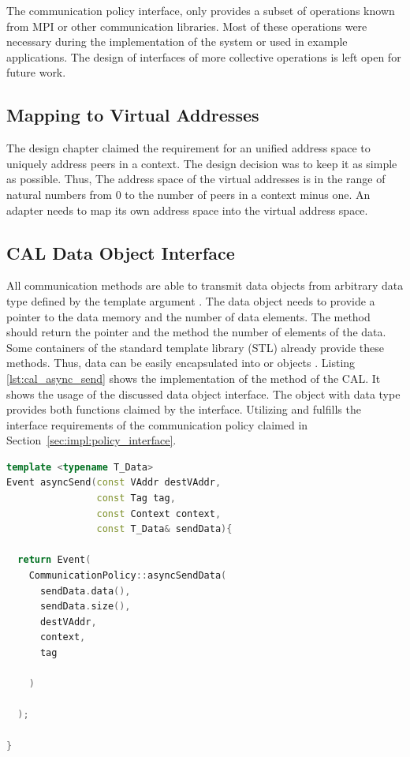 \noindent The communication policy interface, only provides a subset
of operations known from MPI or other communication libraries.  Most
of these operations were necessary during the implementation of the
system or used in example applications. The design of interfaces of
more collective operations is left open for future work.


\subsection{Mapping to Virtual Addresses}
The design chapter claimed the requirement for an unified address
space to uniquely address peers in a context. The design decision was
to keep it as simple as possible. Thus, The address space of the
virtual addresses is in the range of natural numbers from 0 to the
number of peers in a context minus one. An adapter needs to map its
own address space into the virtual address space.

\subsection{CAL Data Object Interface}
All communication methods are able to transmit data objects from
arbitrary data type defined by the template argument . The
data object needs to provide a pointer to the data memory and the
number of data elements.  The method  should return the
pointer and the method  the number of elements of the
data. Some containers of the standard template library (STL) already
provide these methods. Thus, data can be easily encapsulated into
 or  objects \cite{ref:vector,
  ref:array}. Listing \ref{lst:cal_async_send} shows the
implementation of the  method of the CAL. It shows
the usage of the discussed data object interface.  The object
 with data type  provides both functions
claimed by the interface. Utilizing  and
 fulfills the interface requirements of the
communication policy claimed in
Section~\ref{sec:impl:policy_interface}.

\begin{lstlisting}[language=C++, breaklines=false, label={lst:cal_async_send}]
template <typename T_Data>
Event asyncSend(const VAddr destVAddr, 
                const Tag tag, 
                const Context context, 
                const T_Data& sendData){

  return Event(
    CommunicationPolicy::asyncSendData(
      sendData.data(),
      sendData.size(), 
      destVAddr, 
      context, 
      tag
      
    )
      
  );

}
\end{lstlisting}

